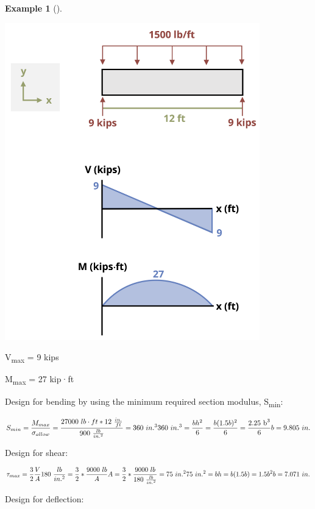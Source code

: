 \documentclass[
  letterpaper,
  DIV=11,
  numbers=noendperiod]{scrreprt}
\theoremstyle{definition}
\newtheorem{example}{Example}[chapter]
\theoremstyle{remark}
\begin{document}
\begin{tcolorbox}
\begin{example}[]
\begin{tcolorbox}
\begin{center}
\includegraphics[width=4.35417in,height=\textheight]{images/CH11 PNGs/example11.8-2.png}
\end{center}

V\textsubscript{max} = 9 kips

M\textsubscript{max} = 27 kip·ft

Design for bending by using the minimum required section modulus,
S\textsubscript{min}:

\[
S_{min}=\frac{M_{max}}{\sigma_{allow}}=\frac{27000{~lb}\cdot{ft}*12~\frac{in.}{ft}}{900~\frac{lb}{in.^2}}=360{~in.^3} \\
360{~in.^3}=\frac{b h^2}{6}=\frac{b(1.5b)^2}{6}=\frac{2.25 \mathrm{~b}^3}{6} \\ 
 b =9.805{~in.}
\]

Design for shear:

\[
\tau_{max}=\frac{3}{2} \frac{V}{A} \\
180~\frac{lb}{in.^2}=\frac{3}{2}*\frac{9000{~lb}}{A} \\
A=\frac{3}{2}*\frac{9000{~lb}}{180~\frac{lb}{in.^2}}=75{~in.^2} \\
75{~in.^2}=b h=b(1.5 b)=1.5 b^2 \\ 
b=7.071{~in.}
\]

Design for deflection:


\end{tcolorbox}
\end{example}
\end{tcolorbox}
\end{document}

